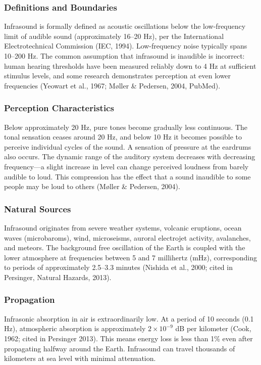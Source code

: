 \documentclass[11pt,letterpaper]{article}
\begin{document}
\subsubsection{Definitions and Boundaries}
Infrasound is formally defined as acoustic oscillations below the low-frequency limit of audible sound (approximately 16--20 Hz), per the International Electrotechnical Commission (IEC, 1994). Low-frequency noise typically spans 10--200 Hz. The common assumption that infrasound is inaudible is incorrect: human hearing thresholds have been measured reliably down to 4 Hz at sufficient stimulus levels, and some research demonstrates perception at even lower frequencies (Yeowart et al., 1967; Møller \& Pedersen, 2004, PubMed).

\subsubsection{Perception Characteristics}
Below approximately 20 Hz, pure tones become gradually less continuous. The tonal sensation ceases around 20 Hz, and below 10 Hz it becomes possible to perceive individual cycles of the sound. A sensation of pressure at the eardrums also occurs. The dynamic range of the auditory system decreases with decreasing frequency---a slight increase in level can change perceived loudness from barely audible to loud. This compression has the effect that a sound inaudible to some people may be loud to others (Møller \& Pedersen, 2004).

\subsubsection{Natural Sources}
Infrasound originates from severe weather systems, volcanic eruptions, ocean waves (microbaroms), wind, microseisms, auroral electrojet activity, avalanches, and meteors. The background free oscillation of the Earth is coupled with the lower atmosphere at frequencies between 5 and 7 millihertz (mHz), corresponding to periods of approximately 2.5--3.3 minutes (Nishida et al., 2000; cited in Persinger, Natural Hazards, 2013).

\subsubsection{Propagation}
Infrasonic absorption in air is extraordinarily low. At a period of 10 seconds (0.1 Hz), atmospheric absorption is approximately $2 \times 10^{-9}$ dB per kilometer (Cook, 1962; cited in Persinger 2013). This means energy loss is less than 1\% even after propagating halfway around the Earth. Infrasound can travel thousands of kilometers at sea level with minimal attenuation.
\end{document}
